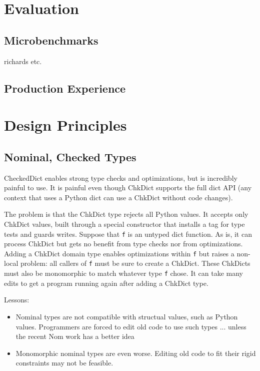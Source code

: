 \documentclass[english,cleveref,submission]{programming}
\newcommand{\code}[1]{\texttt{#1}}
\begin{document}
\section{Evaluation}
\label{s:eval}


\subsection{Microbenchmarks}

richards etc.


\subsection{Production Experience}


\section{Design Principles}

\subsection{Nominal, Checked Types}

CheckedDict enables strong type checks and optimizations, but is incredibly painful to use.
It is painful even though ChkDict supports the full dict API
(any context that uses a Python dict can use a ChkDict without code changes).

The problem is that the ChkDict type rejects all Python values.
It accepts only ChkDict values, built through a special constructor
that installs a tag for type tests and guards writes.
Suppose that \code{f} is an untyped dict function.
As is, it can process ChkDict but gets no benefit from type checks nor from optimizations.
Adding a ChkDict domain type enables optimizations within \code{f} but raises a non-local
problem: all callers of \code{f} must be sure to create a ChkDict.
These ChkDicts must also be monomorphic to match whatever type \code{f} chose.
It can take many edits to get a program running again after adding a ChkDict type.

Lessons:
\begin{itemize}
  \item
    Nominal types are not compatible with structual values, such as Python values.
    Programmers are forced to edit old code to use such types ... unless the recent Nom work has a better idea~\cite{mt-oopsla-2021}
  \item
    Monomorphic nominal types are even worse.
    Editing old code to fit their rigid constraints may not be feasible.

\end{itemize}
\end{document}
